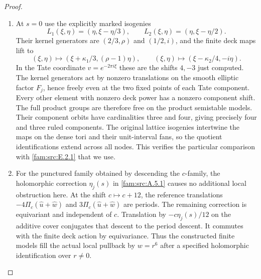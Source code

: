 \begin{proof}
\begin{enumerate}[label=\arabic*.,leftmargin=*]
\item At $s=0$ use the explicitly marked isogenies
\[
 L_1(\xi,\eta)=(\eta,\xi-\eta/3),\qquad
 L_2(\xi,\eta)=(\eta,\xi-\eta/2).
\]
Their kernel generators are $(2/3,\rho)$ and $(1/2,i)$,
and the finite deck maps lift to
\[
 (\xi,\eta)\mapsto(\xi+\kappa_1/3,(\rho-1)\eta),
 \qquad
 (\xi,\eta)\mapsto(\xi-\kappa_2/4,-i\eta).
\]
In the Tate coordinate $v=e^{-2\pi i\xi}$ these are the
shifts $4,-3$ just computed. The kernel generators act
by nonzero translations on the smooth elliptic factor
$F_j$, hence freely even at the two fixed points of each
Tate component. Every other element with nonzero deck
power has a nonzero component shift. The full product
groups are therefore free on the product semistable
models. Their component orbits have cardinalities three
and four, giving precisely four and three ruled
components. The original lattice isogenies intertwine
the maps on the dense tori and their unit-interval fans,
so the quotient identifications extend across all nodes.
This verifies the particular comparison with \cref{fam:src:E.2.1} that
we use.

\item For the punctured family obtained by descending the
$c$-family, the holomorphic correction $\eta_j(s)$ in
\cref{fam:src:A.5.1} causes no additional local obstruction here. At the
shift $c\mapsto c+12$, the reference translations
$-4\Pi_c(\widehat u+\widehat w)$ and
$3\Pi_c(\widehat u+\widehat w)$ are periods.
The remaining correction is equivariant and independent
of $c$. Translation by $-c\eta_j(s)/12$ on the additive
cover conjugates that descent to the period descent.
It commutes with the finite deck action by equivariance.
Thus the constructed finite models fill the actual local
pullback by $w=r^6$ after a specified holomorphic
identification over $r\ne0$. 
\end{enumerate}
\end{proof}